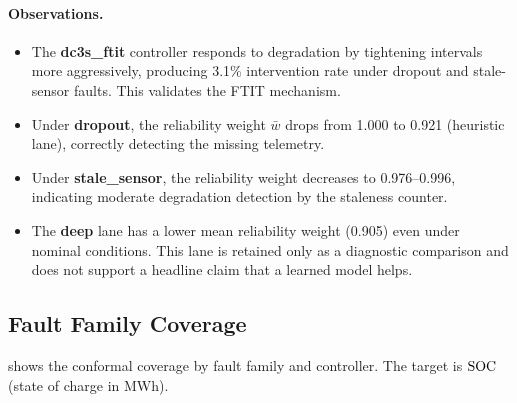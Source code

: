 \paragraph{Observations.}
\begin{itemize}[nosep]
  \item The \textbf{dc3s\_ftit} controller responds to degradation by tightening
        intervals more aggressively, producing 3.1\% intervention rate under dropout
        and stale-sensor faults.  This validates the FTIT mechanism.
  \item Under \textbf{dropout}, the reliability weight $\bar{w}$ drops from 1.000
        to 0.921 (heuristic lane), correctly detecting the missing telemetry.
  \item Under \textbf{stale\_sensor}, the reliability weight decreases to 0.976--0.996,
        indicating moderate degradation detection by the staleness counter.
  \item The \textbf{deep} lane has a lower mean reliability weight (0.905) even
        under nominal conditions.  This lane is retained only as a diagnostic
        comparison and does not support a headline claim that a learned model helps.
\end{itemize}

\subsection{Fault Family Coverage}

 shows the conformal coverage by fault family and controller.
The target is $\mathrm{SOC}$ (state of charge in MWh).

